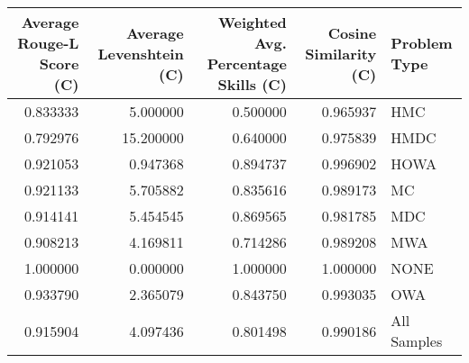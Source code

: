 \begin{tabular}{rrrrl}
\toprule
Average Rouge-L Score (C) & Average Levenshtein (C) & Weighted Avg. Percentage Skills (C) & Cosine Similarity (C) & Problem Type \\
\midrule
0.833333 & 5.000000 & 0.500000 & 0.965937 & HMC \\
0.792976 & 15.200000 & 0.640000 & 0.975839 & HMDC \\
0.921053 & 0.947368 & 0.894737 & 0.996902 & HOWA \\
0.921133 & 5.705882 & 0.835616 & 0.989173 & MC \\
0.914141 & 5.454545 & 0.869565 & 0.981785 & MDC \\
0.908213 & 4.169811 & 0.714286 & 0.989208 & MWA \\
1.000000 & 0.000000 & 1.000000 & 1.000000 & NONE \\
0.933790 & 2.365079 & 0.843750 & 0.993035 & OWA \\
0.915904 & 4.097436 & 0.801498 & 0.990186 & All Samples \\
\bottomrule
\end{tabular}

